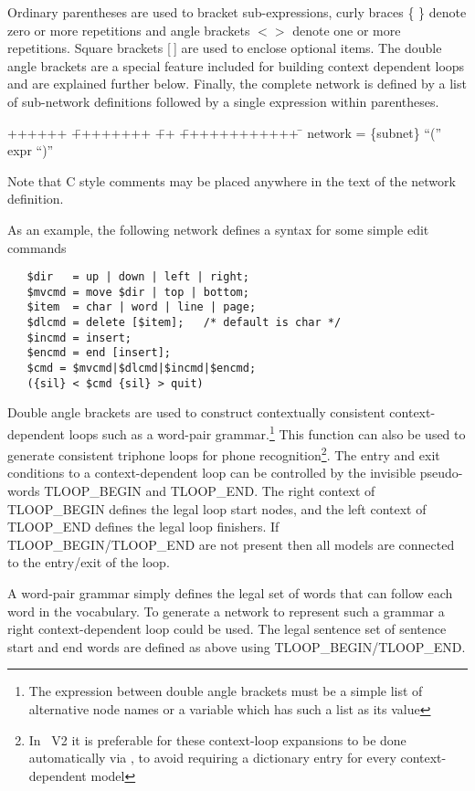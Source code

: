 Ordinary parentheses are used to bracket sub-expressions, curly braces \{ \} denote zero or more repetitions and angle brackets $<>$ denote one or more repetitions.  Square brackets [$\:$] are used to enclose optional items.  The double angle brackets are a special feature included for building context dependent loops and are explained further below.
Finally, the complete network is defined by a list of sub-network
definitions followed by a single expression within parentheses.
{\sf
\begin{tabbing}
++++++ \= ++++++++ \= ++ \= ++++++++++++ \=  \kill
\>    network \> = \> \{subnet\} ``('' expr ``)''
\end{tabbing}}
\noindent
Note that C style comments may be placed anywhere in the text of
the network definition.

As an example, the following network defines a syntax for some
simple edit commands
\begin{verbatim}
   $dir   = up | down | left | right;
   $mvcmd = move $dir | top | bottom;      
   $item  = char | word | line | page;
   $dlcmd = delete [$item];   /* default is char */
   $incmd = insert;
   $encmd = end [insert];
   $cmd = $mvcmd|$dlcmd|$incmd|$encmd;
   ({sil} < $cmd {sil} > quit)
\end{verbatim}

Double angle brackets are used to
construct contextually consistent context-dependent loops such
as a word-pair grammar.\footnote{The expression between 
double angle brackets must be a simple list of alternative node names or
a variable which has such a list as its value}
This function can also be used to generate consistent triphone loops 
for phone recognition\footnote{In \HTK\ V2 it is preferable for
these context-loop expansions to be done automatically via ,
to avoid requiring a dictionary entry for every context-dependent
model}.
The entry and exit conditions to a
context-dependent loop can be controlled by the invisible
pseudo-words TLOOP\_BEGIN and TLOOP\_END.  The right context of TLOOP\_BEGIN
defines the legal loop start nodes, and the left context of TLOOP\_END
defines the legal loop finishers. If TLOOP\_BEGIN/TLOOP\_END are not
present then all models are connected to the entry/exit of the loop.

A word-pair grammar simply defines the legal
set of words that can follow each word in the vocabulary.
To generate a network to represent such a grammar a
right context-dependent loop could be used.
The legal sentence set of sentence start and end words are defined as
above using TLOOP\_BEGIN/TLOOP\_END.

